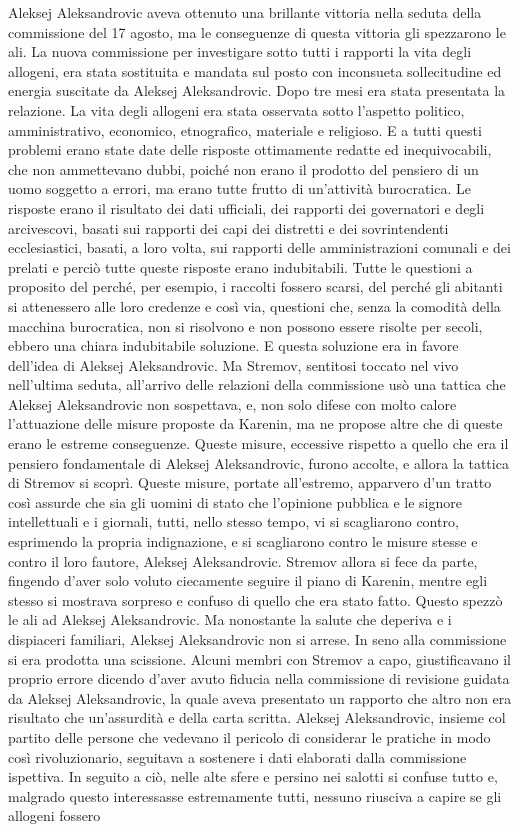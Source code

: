 Aleksej Aleksandrovic aveva ottenuto una brillante vittoria nella seduta della commissione del 17 agosto, ma le conseguenze di questa vittoria gli spezzarono le ali. La nuova commissione per investigare sotto tutti i rapporti la vita degli allogeni, era stata sostituita e mandata sul posto con inconsueta sollecitudine ed energia suscitate da Aleksej Aleksandrovic. Dopo tre mesi era stata presentata la relazione. La vita degli allogeni era stata osservata sotto l'aspetto politico, amministrativo, economico, etnografico, materiale e religioso. E a tutti questi problemi erano state date delle risposte ottimamente redatte ed inequivocabili, che non ammettevano dubbi, poiché non erano il prodotto del pensiero di un uomo soggetto a errori, ma erano tutte frutto di un'attività burocratica. Le risposte erano il risultato dei dati ufficiali, dei rapporti dei governatori e degli arcivescovi, basati sui rapporti dei capi dei distretti e dei sovrintendenti ecclesiastici, basati, a loro volta, sui rapporti delle amministrazioni comunali e dei prelati e perciò tutte queste risposte erano indubitabili. Tutte le questioni a proposito del perché, per esempio, i raccolti fossero scarsi, del perché gli abitanti si attenessero alle loro credenze e così via, questioni che, senza la comodità della macchina burocratica, non si risolvono e non possono essere risolte per secoli, ebbero una chiara indubitabile soluzione. E questa soluzione era in favore dell'idea di Aleksej Aleksandrovic. Ma Stremov, sentitosi toccato nel vivo nell'ultima seduta, all'arrivo delle relazioni della commissione usò una tattica che Aleksej Aleksandrovic non sospettava, e, non solo difese con molto calore l'attuazione delle misure proposte da Karenin, ma ne propose altre che di queste erano le estreme conseguenze. Queste misure, eccessive rispetto a quello che era il pensiero fondamentale di Aleksej Aleksandrovic, furono accolte, e allora la tattica di Stremov si scoprì. Queste misure, portate all'estremo, apparvero d'un tratto così assurde che sia gli uomini di stato che l'opinione pubblica e le signore intellettuali e i giornali, tutti, nello stesso tempo, vi si scagliarono contro, esprimendo la propria indignazione, e si scagliarono contro le misure stesse e contro il loro fautore, Aleksej Aleksandrovic. Stremov allora si fece da parte, fingendo d'aver solo voluto ciecamente seguire il piano di Karenin, mentre egli stesso si mostrava sorpreso e confuso di quello che era stato fatto. Questo spezzò le ali ad Aleksej Aleksandrovic. Ma nonostante la salute che deperiva e i dispiaceri familiari, Aleksej Aleksandrovic non si arrese. In seno alla commissione si era prodotta una scissione. Alcuni membri con Stremov a capo, giustificavano il proprio errore dicendo d'aver avuto fiducia nella commissione di revisione guidata da Aleksej Aleksandrovic, la quale aveva presentato un rapporto che altro non era risultato che un'assurdità e della carta scritta. Aleksej Aleksandrovic, insieme col partito delle persone che vedevano il pericolo di considerar le pratiche in modo così rivoluzionario, seguitava a sostenere i dati elaborati dalla commissione ispettiva. In seguito a ciò, nelle alte sfere e persino nei salotti si confuse tutto e, malgrado questo interessasse estremamente tutti, nessuno riusciva a capire se gli allogeni fossero 